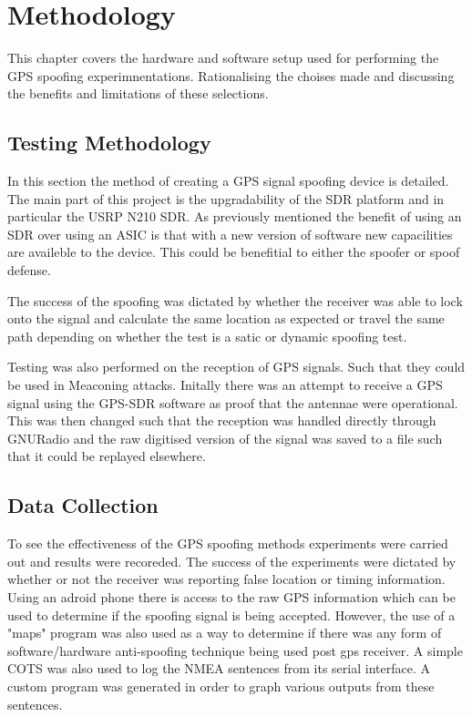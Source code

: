\chapter{Methodology} %

\label{Chapter4} %

This chapter covers the hardware and software setup used for performing the GPS spoofing experimnentations. Rationalising the choises made and discussing the benefits and
limitations of these selections.


\section{Testing Methodology}

In this section the method of creating a GPS signal spoofing device is detailed. The main part of this project is the upgradability of the SDR platform
and in particular the USRP N210 SDR. As previously mentioned the benefit of using an SDR over using an ASIC is that with a new version of software 
new capacilities are availeble to the device. This could be benefitial to either the spoofer or spoof defense. 

The success of the spoofing was dictated by whether the receiver was able to lock onto the signal and calculate the same location as expected or travel the same path
depending on whether the test is a satic or dynamic spoofing test. 

Testing was also performed on the reception of GPS signals. Such that they could be used in Meaconing attacks. Initally there was an attempt to receive a GPS signal using
the GPS-SDR software as proof that the antennae were operational. This was then changed such that the reception was handled directly through GNURadio and the raw
digitised version of the signal was saved to a file such that it could be replayed elsewhere.

\section{Data Collection}

To see the effectiveness of the GPS spoofing methods experiments were carried out and results were recoreded. The success of the experiments were dictated by whether or
not the receiver was reporting false location or timing information. Using an adroid phone there is access to the raw GPS information which can be used to determine if
the spoofing signal is being accepted. However, the use of a "maps" program was also used as a way to determine if there was any form of software/hardware anti-spoofing
technique being used post gps receiver. A simple COTS was also used to log the NMEA sentences from its serial interface. A custom program was generated in order to graph
various outputs from these sentences. 

